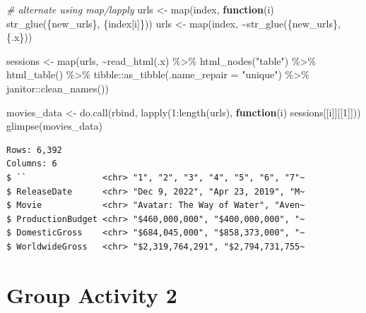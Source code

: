 \documentclass[
]{book}
\newenvironment{Shaded}{\begin{snugshade}}{\end{snugshade}}
\newcommand{\AttributeTok}[1]{\textcolor[rgb]{0.77,0.63,0.00}{#1}}
\newcommand{\CommentTok}[1]{\textcolor[rgb]{0.56,0.35,0.01}{\textit{#1}}}
\newcommand{\ControlFlowTok}[1]{\textcolor[rgb]{0.13,0.29,0.53}{\textbf{#1}}}
\newcommand{\DecValTok}[1]{\textcolor[rgb]{0.00,0.00,0.81}{#1}}
\newcommand{\FunctionTok}[1]{\textcolor[rgb]{0.00,0.00,0.00}{#1}}
\newcommand{\NormalTok}[1]{#1}
\newcommand{\OtherTok}[1]{\textcolor[rgb]{0.56,0.35,0.01}{#1}}
\newcommand{\SpecialCharTok}[1]{\textcolor[rgb]{0.00,0.00,0.00}{#1}}
\newcommand{\StringTok}[1]{\textcolor[rgb]{0.31,0.60,0.02}{#1}}
\begin{document}
\begin{Shaded}
\begin{Highlighting}[]
\CommentTok{\# alternate using map/lapply}
\NormalTok{urls }\OtherTok{\textless{}{-}} \FunctionTok{map}\NormalTok{(index, }\ControlFlowTok{function}\NormalTok{(i) }\FunctionTok{str\_glue}\NormalTok{(\{new\_urls\}, \{index[i]\}))}
\NormalTok{urls }\OtherTok{\textless{}{-}} \FunctionTok{map}\NormalTok{(index, }\SpecialCharTok{\textasciitilde{}}\FunctionTok{str\_glue}\NormalTok{(\{new\_urls\}, \{.x\}))}


\NormalTok{sessions }\OtherTok{\textless{}{-}} \FunctionTok{map}\NormalTok{(urls, }\SpecialCharTok{\textasciitilde{}}\FunctionTok{read\_html}\NormalTok{(.x) }\SpecialCharTok{\%\textgreater{}\%} 
                  \FunctionTok{html\_nodes}\NormalTok{(}\StringTok{"table"}\NormalTok{) }\SpecialCharTok{\%\textgreater{}\%} 
                  \FunctionTok{html\_table}\NormalTok{() }\SpecialCharTok{\%\textgreater{}\%} 
\NormalTok{                  tibble}\SpecialCharTok{::}\FunctionTok{as\_tibble}\NormalTok{(}\AttributeTok{.name\_repair =} \StringTok{"unique"}\NormalTok{) }\SpecialCharTok{\%\textgreater{}\%} 
\NormalTok{                  janitor}\SpecialCharTok{::}\FunctionTok{clean\_names}\NormalTok{())}

\NormalTok{movies\_data }\OtherTok{\textless{}{-}} \FunctionTok{do.call}\NormalTok{(rbind, }\FunctionTok{lapply}\NormalTok{(}\DecValTok{1}\SpecialCharTok{:}\FunctionTok{length}\NormalTok{(urls), }\ControlFlowTok{function}\NormalTok{(i) sessions[[i]][[}\DecValTok{1}\NormalTok{]]))}
\FunctionTok{glimpse}\NormalTok{(movies\_data)}
\end{Highlighting}
\end{Shaded}

\begin{verbatim}
Rows: 6,392
Columns: 6
$ ``               <chr> "1", "2", "3", "4", "5", "6", "7"~
$ ReleaseDate      <chr> "Dec 9, 2022", "Apr 23, 2019", "M~
$ Movie            <chr> "Avatar: The Way of Water", "Aven~
$ ProductionBudget <chr> "$460,000,000", "$400,000,000", "~
$ DomesticGross    <chr> "$684,045,000", "$858,373,000", "~
$ WorldwideGross   <chr> "$2,319,764,291", "$2,794,731,755~
\end{verbatim}

\hypertarget{group-activity-2-4}{%
\section{Group Activity 2}\label{group-activity-2-4}}
\end{document}
